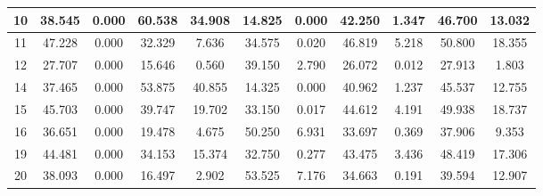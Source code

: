 \begin{table}[]
\begin{tabular}{|c|cc|cc|cc|cc|cc|}
10 & 38.545 & \cellcolor[HTML]{EFEFEF}0.000 & 60.538 & \cellcolor[HTML]{EFEFEF}34.908 & 14.825 & \cellcolor[HTML]{EFEFEF}0.000 & 42.250 & \cellcolor[HTML]{EFEFEF}1.347 & 46.700 & \cellcolor[HTML]{EFEFEF}13.032 \\ \hline
11 & 47.228 & \cellcolor[HTML]{EFEFEF}0.000 & 32.329 & \cellcolor[HTML]{EFEFEF}7.636 & 34.575 & \cellcolor[HTML]{EFEFEF}0.020 & 46.819 & \cellcolor[HTML]{EFEFEF}5.218 & 50.800 & \cellcolor[HTML]{EFEFEF}18.355 \\ \hline
12 & 27.707 & \cellcolor[HTML]{EFEFEF}0.000 & 15.646 & \cellcolor[HTML]{EFEFEF}0.560 & 39.150 & \cellcolor[HTML]{EFEFEF}2.790 & 26.072 & \cellcolor[HTML]{EFEFEF}0.012 & 27.913 & \cellcolor[HTML]{EFEFEF}1.803 \\ \hline
14 & 37.465 & \cellcolor[HTML]{EFEFEF}0.000 & 53.875 & \cellcolor[HTML]{EFEFEF}40.855 & 14.325 & \cellcolor[HTML]{EFEFEF}0.000 & 40.962 & \cellcolor[HTML]{EFEFEF}1.237 & 45.537 & \cellcolor[HTML]{EFEFEF}12.755 \\ \hline
15 & 45.703 & \cellcolor[HTML]{EFEFEF}0.000 & 39.747 & \cellcolor[HTML]{EFEFEF}19.702 & 33.150 & \cellcolor[HTML]{EFEFEF}0.017 & 44.612 & \cellcolor[HTML]{EFEFEF}4.191 & 49.938 & \cellcolor[HTML]{EFEFEF}18.737 \\ \hline
16 & 36.651 & \cellcolor[HTML]{EFEFEF}0.000 & 19.478 & \cellcolor[HTML]{EFEFEF}4.675 & 50.250 & \cellcolor[HTML]{EFEFEF}6.931 & 33.697 & \cellcolor[HTML]{EFEFEF}0.369 & 37.906 & \cellcolor[HTML]{EFEFEF}9.353 \\ \hline
19 & 44.481 & \cellcolor[HTML]{EFEFEF}0.000 & 34.153 & \cellcolor[HTML]{EFEFEF}15.374 & 32.750 & \cellcolor[HTML]{EFEFEF}0.277 & 43.475 & \cellcolor[HTML]{EFEFEF}3.436 & 48.419 & \cellcolor[HTML]{EFEFEF}17.306 \\ \hline
20 & 38.093 & \cellcolor[HTML]{EFEFEF}0.000 & 16.497 & \cellcolor[HTML]{EFEFEF}2.902 & 53.525 & \cellcolor[HTML]{EFEFEF}7.176 & 34.663 & \cellcolor[HTML]{EFEFEF}0.191 & 39.594 & \cellcolor[HTML]{EFEFEF}12.907 \\ \hline
\end{tabular}
\end{table}

